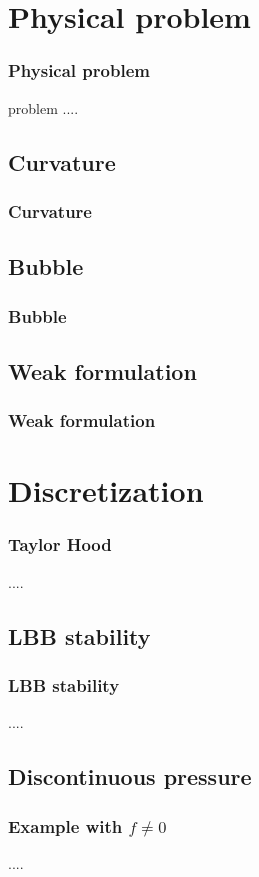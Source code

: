 \section{Physical problem}
\begin{frame}
  \frametitle{Physical problem}
  \begin{block}{} 
    problem ....
  \end{block}
\end{frame}

\subsection{Curvature}
\begin{frame}
  \frametitle{Curvature}

\end{frame}

\subsection{Bubble}
\begin{frame}
  \frametitle{Bubble}

\end{frame}

\subsection{Weak formulation}
\begin{frame}
  \frametitle{Weak formulation}

\end{frame}


\section{Discretization}

\begin{frame}
  \frametitle{Taylor Hood}
  \begin{block}{}
    ....
  \end{block}
\end{frame}


\subsection{LBB stability}
\begin{frame}
  \frametitle{LBB stability}
  \begin{block}{}
    ....
  \end{block}
\end{frame}


\subsection{Discontinuous pressure}
\begin{frame}
  \frametitle{Example with $f \neq 0$}
  \begin{block}{}
    ....
  \end{block}
\end{frame}
